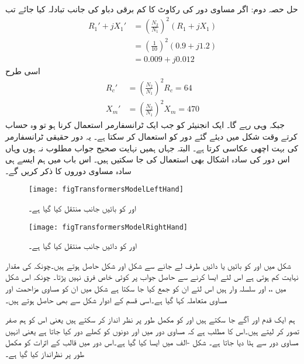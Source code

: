 	حل حصہ دوم:
اگر مساوی دور کی رکاوٹ کا کم برقی دباو کی جانب تبادلہ کیا جائے تب
\begin{align*}
R_1'+j X_1' &=\left(\frac{N_2}{N_1} \right)^2 \left(R_1+j X_1 \right)\\
&=\left(\frac{1}{10} \right)^2 \left(0.9+j1.2 \right)\\
&=0.009+j0.012
\end{align*}
اسی طرح
\begin{align*}
R_c'&=\left(\frac{N_2}{N_1} \right)^2 R_c=64\\
X_m'&=\left(\frac{N_2}{N_1} \right)^2 X_m=470
\end{align*}
جبکہ  وہی رہے گا۔
%
ایک انجنیئر کو جب ایک ٹرانسفارمر استعمال کرنا ہو تو وہ حساب کرتے وقت شکل   میں دیئے گئے دور کو استعمال کر سکتا ہے۔ یہ دور حقیقی ٹرانسفارمر کی بہت اچھی عکاسی کرتا ہے۔ البتہ جہاں ہمیں نہایت صحیح جواب مطلوب نہ ہوں وہاں اس دور کی سادہ اشکال بھی استعمال کی جا سکتیں ہیں۔ اس باب میں ہم ایسے ہی سادہ مساوی دوروں کا ذکر کریں گے۔
\begin{figure}
\centering
\texttt{[image: figTransformersModelLeftHand]}
\caption{ اور  کو بائیں جانب منتقل کیا گیا ہے۔}
\label{شکل_ٹرانسفارمر_بائیں_جانب}
\end{figure}
%
\begin{figure}
\centering
\texttt{[image: figTransformersModelRightHand]}
\caption{ اور  کو دائیں جانب منتقل کیا گیا ہے۔}
\label{شکل_ٹرانسفارمر_دائیں_جانب}
\end{figure}

شکل   میں  اور  کو بائیں یا دائیں طرف لے جانے سے  شکل    اور  شکل   حاصل ہوتے ہیں۔چونکہ  کی مقدار نہایت کم  ہوتی ہے اس لئے ایسا  کرنے سے حاصل جواب پر کوئی خاص فرق نہیں پڑتا۔ چونکہ اس شکل میں  ،،   اور  سلسلہ وار ہیں اس لئے ان کو جمع کیا جا سکتا ہے شکل میں ان کو مساوی مزاحمت   اور مساوی متعاملہ  کہا گیا ہے۔اسی قسم کے ادوار  شکل   سے بھی حاصل ہوتے  ہیں۔

ہم ایک قدم اور آگے جا سکتے ہیں اور  کو مکمل طور پر نظر انداز کر سکتے ہیں یعنی اس کو ہم صفر تصور کر لیتے ہیں۔اس کا مطلب ہے کہ مساوی دور میں  اور  دونوں کو کھلے دور کیا جاتا ہے  یعنی انہیں مساوی دور سے ہٹا دیا جاتا ہے۔ شکل -الف  میں ایسا کیا گیا ہے۔اس دور میں قالب کے اثرات کو مکمل طور پر نظرانداز کیا گیا ہے۔

